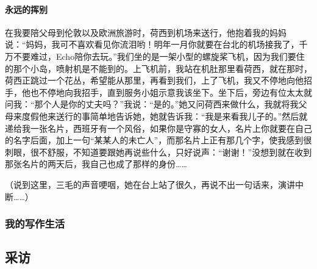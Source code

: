 \paragraph{永远的挥别}
\par 在我要陪父母到伦敦以及欧洲旅游时，荷西到机场来送行，他抱着我的妈妈说：“妈妈，我可不喜欢看见你流泪哟！明年一月你就要在台北的机场接我了，千万不要难过，Echo陪你去玩。”我们坐的是一架小型的螺旋桨飞机，因为我们要住的那个小岛，喷射机是不能到的。上飞机前，我站在机肚那里看荷西，就在那时，荷西正跳过一个花丛，希望能从那里，再看到我们，上了飞机，我又不停地向他招手，他也不停地向我招手，直到服务小姐示意我该坐下。坐下后，旁边有位太太就问我：“那个人是你的丈夫吗？”我说：“是的。”她又问荷西来做什么，我就将我父母来度假他来送行的事简单地告诉她，她就告诉我：“我是来看我儿子的。”然后就递给我一张名片，西班牙有一个风俗，如果你是守寡的女人，名片上你就要在自己的名字后面，加上一句“某某人的未亡人”，而那名片上正有那几个字，使我感到很刺眼，很不舒服，不知道要跟她再说些什么，只好说声：“谢谢！”没想到就在收到那张名片的两天后，我自己也成了那样的身份……
\par （说到这里，三毛的声音哽咽，她在台上站了很久，再说不出一句话来，演讲中断……）


\subsubsection{我的写作生活}
















\subsection{采访}












